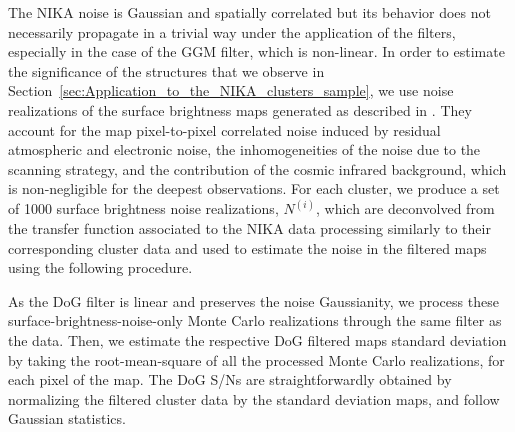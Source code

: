\documentclass[traditabstract]{aa}
\begin{document}
The NIKA noise is Gaussian and spatially correlated \citep{Adam2016a} but its behavior does not necessarily propagate in a trivial way under the application of the filters, especially in the case of the GGM filter, which is non-linear. In order to estimate the significance of the structures that we observe in Section~\ref{sec:Application_to_the_NIKA_clusters_sample}, we use noise realizations of the surface brightness maps generated as described in \cite{Adam2016a}. They account for the map pixel-to-pixel correlated noise induced by residual atmospheric and electronic noise, the inhomogeneities of the noise due to the scanning strategy, and the contribution of the cosmic infrared background, which is non-negligible for the deepest observations. For each cluster, we produce a set of 1000 surface brightness noise realizations, $N^{(i)}$, which are deconvolved from the transfer function associated to the NIKA data processing similarly to their corresponding cluster data and used to estimate the noise in the filtered maps using the following procedure. 

As the DoG filter is linear and preserves the noise Gaussianity, we process these surface-brightness-noise-only Monte Carlo realizations through the same filter as the data. Then, we estimate the respective DoG filtered maps standard deviation by taking the root-mean-square of all the processed Monte Carlo realizations, for each pixel of the map. The DoG S/Ns are straightforwardly obtained by normalizing the filtered cluster data by the standard deviation maps, and follow Gaussian statistics.
\end{document}
